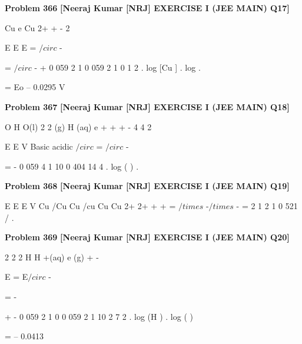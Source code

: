 \begin{problembox}
\textbf{Problem 366} \hfill \textbf{[Neeraj Kumar [NRJ] EXERCISE I (JEE MAIN) Q17]}
\label{q:ext-nrj_all_questions-366}

Cu
e
Cu
2+ +
-
2

  


 



 
 
E
E
E
=
$/circ$ -
 
=
$/circ$ -
+
0 059
2
1
0 059
2
1
0 1
2
.
log
[Cu
]
.
log .
 
      = Eo -- 0.0295 V
\end{problembox}

\begin{problembox}
\textbf{Problem 367} \hfill \textbf{[Neeraj Kumar [NRJ] EXERCISE I (JEE MAIN) Q18]}
\label{q:ext-nrj_all_questions-367}

O
H O(l)
2
2
(g)
H (aq)
e
+
+
+
-
4
4
2

  


 



 
 
E
E
V
Basic
acidic
$/circ$
=
$/circ$
-
 
=
-
0 059
4
1
10
0 404
14 4
.
log
(
)
.
\end{problembox}

\begin{problembox}
\textbf{Problem 368} \hfill \textbf{[Neeraj Kumar [NRJ] EXERCISE I (JEE MAIN) Q19]}
\label{q:ext-nrj_all_questions-368}

E
E
E
V
Cu /Cu
Cu
/cu
Cu
Cu
2+
2+
+
+
=
$/times$
-$/times$
-
=
2
1
2
1
0 521
/
.
\end{problembox}

\begin{problembox}
\textbf{Problem 369} \hfill \textbf{[Neeraj Kumar [NRJ] EXERCISE I (JEE MAIN) Q20]}
\label{q:ext-nrj_all_questions-369}

2
2
2
H
H
+(aq)
e
(g)
+
-
  


 



 
 
E = E$/circ$ -
 
=
-
 
+
-
0 059
2
1
0
0 059
2
1
10
2
7 2
.
log
(H )
.
log
(
)
 
 = -- 0.0413
\end{problembox}

